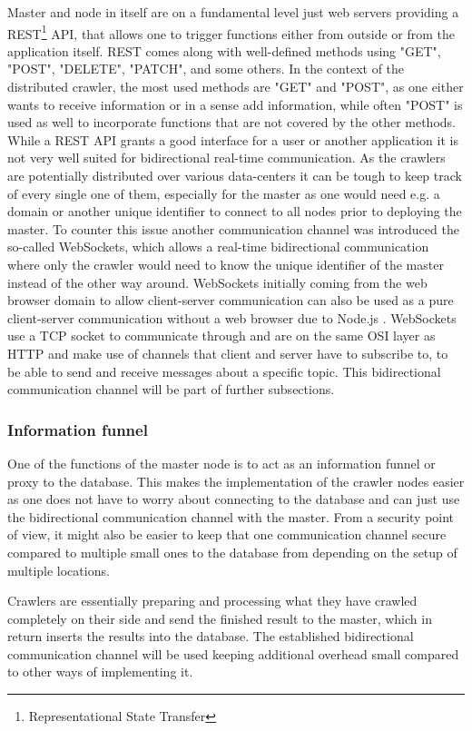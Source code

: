 Master and node in itself are on a fundamental level just web servers providing a REST\footnote{Representational State Transfer} API, that allows one to trigger functions either from outside or from the application itself. REST comes along with well-defined methods using "GET", "POST", "DELETE", "PATCH", and some others. In the context of the distributed crawler, the most used methods are "GET" and "POST", as one either wants to receive information or in a sense add information, while often "POST" is used as well to incorporate functions that are not covered by the other methods.
While a REST API grants a good interface for a user or another application it is not very well suited for bidirectional real-time communication. As the crawlers are potentially distributed over various data-centers it can be tough to keep track of every single one of them, especially for the master as one would need e.g. a domain or another unique identifier to connect to all nodes prior to deploying the master. To counter this issue another communication channel was introduced the so-called WebSockets, which allows a real-time bidirectional communication where only the crawler would need to know the unique identifier of the master instead of the other way around. WebSockets initially coming from the web browser domain to allow client-server communication can also be used as a pure client-server communication without a web browser due to Node.js . WebSockets use a TCP socket to communicate through and are on the same OSI layer as HTTP and make use of channels that client and server have to subscribe to, to be able to send and receive messages about a specific topic. This bidirectional communication channel will be part of further subsections.

\subsubsection{Information funnel}
One of the functions of the master node is to act as an information funnel or proxy to the database. This makes the implementation of the crawler nodes easier as one does not have to worry about connecting to the database and can just use the bidirectional communication channel with the master. From a security point of view, it might also be easier to keep that one communication channel secure compared to multiple small ones to the database from depending on the setup of multiple locations.

Crawlers are essentially preparing and processing what they have crawled completely on their side and send the finished result to the master, which in return inserts the results into the database. The established bidirectional communication channel will be used keeping additional overhead small compared to other ways of implementing it.

